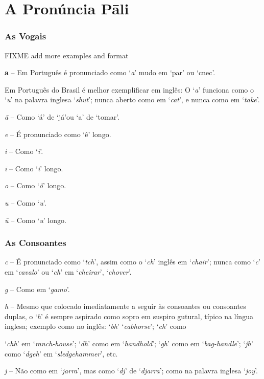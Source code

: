 \chapter{A Pronúncia Pāli}
\label{pron-pali}

\subsection{As Vogais}

FIXME add more examples and format

\textbf{a} -- Em Português é pronunciado como ‘\emph{a}’ mudo em ‘par’ ou ‘cnec’.

Em Português do Brasil é melhor exemplificar em inglês: O ‘\emph{a}’ funciona como o ‘\emph{u}’ na palavra inglesa ‘\emph{shut}’; nunca aberto como em ‘\emph{cat}’, e nunca como em ‘\emph{take}’.

\emph{ā} -- Como ‘á’ de ‘já'ou ‘a’ de ‘tomar’.

\emph{e} -- É pronunciado como ‘ê’ longo.

\emph{i} -- Como ‘\emph{i}’.

\emph{ī} -- Como ‘\emph{i}’ longo.

\emph{o} -- Como ‘\emph{ô}’ longo.

\emph{u} -- Como ‘\emph{u}’.

\emph{ū} -- Como ‘\emph{u}’ longo.

\subsection{As Consoantes}

\emph{c} -- É pronunciado como ‘\emph{tch}’, assim como o ‘\emph{ch}’ inglês em ‘\emph{chair}’; nunca como ‘\emph{c}’ em ‘\emph{cavalo}’ ou ‘\emph{ch}’ em ‘\emph{cheirar}’, ‘\emph{chover}’.

\emph{g} -- Como em ‘\emph{gamo}’.

\emph{h} -- Mesmo que colocado imediatamente a seguir às consoantes ou consoantes duplas, o ‘\emph{h}’ é sempre aspirado como sopro em suspiro gutural, típico na língua inglesa; exemplo como no inglês: ‘\emph{bh}’ ‘\emph{cabhorse}’; ‘\emph{ch}’ como

‘\emph{chh}’ em ‘\emph{ranch-house}’; ‘\emph{dh}’ como em ‘\emph{handhold}’; ‘\emph{gh}’ como em ‘\emph{bag-handle}’; ‘\emph{jh}’ como ‘\emph{dgeh}’ em ‘\emph{sledgehammer}’, etc.

\emph{j} -- Não como em ‘\emph{jarra}’, mas como ‘\emph{dj}’ de ‘\emph{djarra}’; como na palavra inglesa ‘\emph{joy}’.

